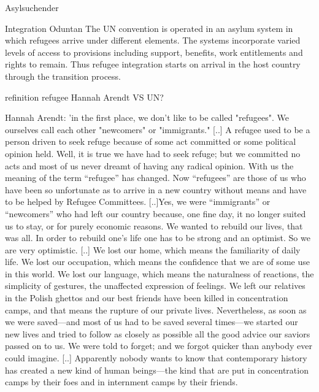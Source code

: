 Asylsuchender

Integration
Oduntan
The UN convention is operated in an asylum system in
which refugees arrive under different elements. The
systems incorporate varied levels of access to provisions
including support, benefits, work entitlements and rights to
remain. Thus refugee integration starts on arrival in the host
country through the transition process.



refinition refugee Hannah Arendt VS UN?

Hannah Arendt: 'in the first place, we don't like to be called "refugees". We ourselves call each other "newcomers" or "immigrants." [..] A refugee used to be a person driven to seek refuge because of some act committed or some political opinion held. Well, it is true we have had to seek refuge; but we committed no acts and most of us never dreamt of having any radical opinion. With us the meaning of the term “refugee” has changed. Now “refugees” are those of us who have been so unfortunate as to arrive in a new country without means and have to be helped by Refugee Committees.
[..]Yes, we were “immigrants” or “newcomers” who had left our country because, one fine day, it no longer suited us to stay, or for purely economic reasons. We wanted to rebuild our lives, that was all. In order to rebuild one’s life one has to be strong and an optimist. So we are very optimistic. [..]
We lost our home, which means the familiarity of daily life. We lost our occupation, which means the confidence that we are of some use in this world. We lost our language, which means the naturalness of reactions, the simplicity of gestures, the unaffected expression of feelings. We left our relatives in the Polish ghettos and our best friends have been killed in concentration camps, and that means the rupture of our private lives.
Nevertheless, as soon as we were saved—and most of us had to be saved several times—we started our new lives and tried to follow as closely as possible all the good advice our saviors passed on to us. We were told to forget; and we forgot quicker than anybody ever could imagine.
[..] Apparently nobody wants to know that contemporary history has created a new kind of human beings—the kind that are put in concentration camps by their foes and in internment camps by their friends.

